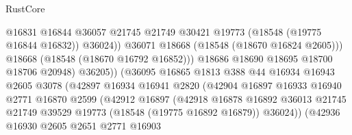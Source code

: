 \begin{lexlean}{RustCore}
\begin{coremodule}
                                          @16831
                                          @16844
                                          @36057
                                          @21745
                                          @21749
                                          @30421
                                          @19773
                                          (@18548 (@19775 @16844 @16832))
                                          @36024))
                                      @36071
                                      @18668
                                      (@18548 (@18670 @16824 @2605)))
                                    @18668
                                    (@18548 (@18670 @16792 @16852)))
                                  @18686
                                  @18690
                                  @18695
                                  @18700
                                  @18706
                                  @20948)
                                @36205))
                            (@36095
                              @16865
                              @1813
                              @388
                              @44
                              @16934
                              @16943
                              @2605
                              @3078
                              (@42897
                                @16934
                                @16941
                                @2820
                                (@42904
                                  @16897
                                  @16933
                                  @16940
                                  @2771
                                  @16870
                                  @2599
                                  (@42912
                                    @16897
                                    (@42918
                                      @16878
                                      @16892
                                      @36013
                                      @21745
                                      @21749
                                      @39529
                                      @19773
                                      (@18548 (@19775 @16892 @16879))
                                      @36024))
                                  (@42936
                                    @16930
                                    @2605
                                    @2651
                                    @2771
                                    @16903

\end{coremodule}
\end{lexlean}
